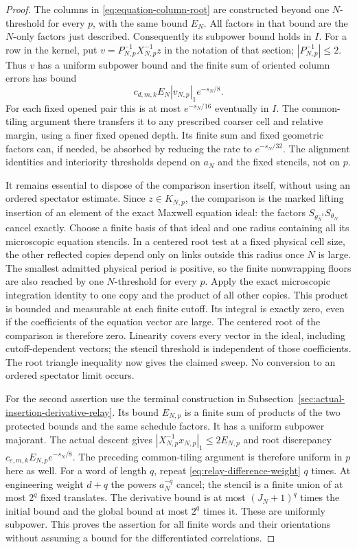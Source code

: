 \begin{proof}
The columns in \eqref{eq:equation-column-root} are constructed beyond
one $N$-threshold for every $p$, with the same bound $E_N$.
All factors in that bound are the $N$-only factors just described.
Consequently its subpower bound holds in $I$. For a row in the kernel,
put $v=P_{N,p}^{-1}X_{N,p}^{-1}z$ in the notation of that section;
$|P_{N,p}^{-1}|\le2$. Thus $v$ has a uniform subpower bound and the
finite sum of oriented column errors has bound
\[
              c_{d,m,k} E_N |v_{N,p}|_1 e^{-s_N/8}.
\]
For each fixed opened pair this is at most $e^{-s_N/16}$ eventually
in $I$. The common-tiling argument there transfers it to any prescribed
coarser cell and relative margin, using a finer fixed opened depth.
Its finite sum and fixed geometric factors can, if needed, be absorbed
by reducing the rate to $e^{-s_N/32}$. The alignment identities and
interiority thresholds depend on $a_N$ and the fixed stencils, not on $p$.

It remains essential to dispose of the comparison insertion itself,
without using an ordered spectator estimate. Since $z\in K_{N,p}$,
the comparison is the marked lifting insertion of an element of the exact
Maxwell equation ideal: the factors $S_{\theta_N^{-1}}S_{\theta_N}$
cancel exactly. Choose a finite basis of that ideal and one radius
containing all its microscopic equation stencils. In a centered root
test at a fixed physical cell size, the other reflected copies depend
only on links outside this radius once $N$ is large. The smallest
admitted physical period is positive, so the finite nonwrapping floors
are also reached by one $N$-threshold for every $p$. Apply the exact
microscopic integration identity to one copy and the product of all
other copies. This product is bounded and measurable at each finite
cutoff. Its integral is exactly zero, even if the coefficients of the
equation vector are large. The centered root of the comparison is
therefore zero. Linearity covers every vector in the ideal, including
cutoff-dependent vectors; the stencil threshold is independent of those
coefficients. The root triangle inequality now gives the claimed sweep.
No conversion to an ordered spectator limit occurs.

For the second assertion use the terminal construction in
Subsection~\ref{sec:actual-insertion-derivative-relay}. Its bound
$E_{N,p}$ is a finite sum of products of the two protected bounds and
the same schedule factors. It has a uniform subpower majorant.
The actual descent gives
$|X_{N,p}^{-1}x_{N,p}|_1\le2E_{N,p}$ and root discrepancy
$c_{e,m,k}E_{N,p}e^{-s_N/8}$. The preceding common-tiling argument is
therefore uniform in $p$ here as well. For a word of length $q$, repeat
\eqref{eq:relay-difference-weight} $q$ times. At engineering weight
$d+q$ the powers $a_N^{-q}$ cancel; the stencil is a finite union of
at most $2^q$ fixed translates. The derivative bound is at most
$(J_N+1)^q$ times the initial bound and the global bound at most $2^q$
times it. These are uniformly subpower. This proves the assertion for
all finite words and their orientations without assuming a bound for
the differentiated correlations.
\end{proof}

